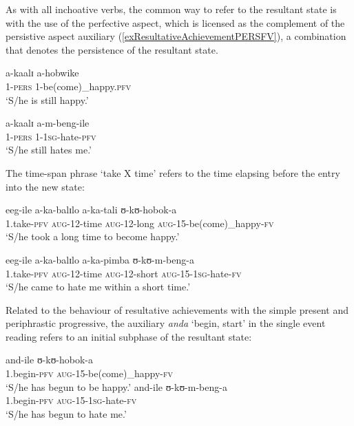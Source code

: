 As with all inchoative verbs, the common way to refer to the resultant state is with the use of the perfective aspect, which is licensed as the complement of the persistive aspect auxiliary (\ref{exResultativeAchievementPERSFV}), a combination that denotes the persistence of the resultant state.
\begin{exe}
\ex \label{exResultativeAchievementPERSFV}\begin{xlist}
\ex\gll a-kaalɪ a-hobwike\\
1-\textsc{pers} 1-be(come)\_happy.\textsc{pfv}\\
\glt `S/he is still happy.'

\ex \gll a-kaalɪ a-m-beng-ile\\
1-\textsc{pers} 1-\textsc{1sg}-hate-\textsc{pfv}\\
\glt \lq S/he still hates me.'
\end{xlist}
\end{exe}

The time-span phrase \lq take X time' refers to the time elapsing before the entry into the new state:

\begin{exe}
\ex \begin{xlist}
\ex \gll eeg-ile a-ka-balɪlo a-ka-tali ʊ-kʊ-hobok-a\\
1.take-\textsc{pfv} \textsc{aug}-12-time \textsc{aug}-12-long \textsc{aug}-15-be(come)\_happy-\textsc{fv}\\
\glt \lq S/he took a long time to become happy.'

\ex \gll eeg-ile a-ka-balɪlo a-ka-pimba ʊ-kʊ-m-beng-a\\
1.take-\textsc{pfv} \textsc{aug}-12-time \textsc{aug}-12-short \textsc{aug}-15-\textsc{1sg}-hate-\textsc{fv}\\
\glt \lq S/he came to hate me within a short time.'
\end{xlist}
\end{exe}

Related to the behaviour of resultative achievements with the simple present and periphrastic progressive, the auxiliary \textit{anda} `begin, start' in the single event reading refers to an initial subphase of the resultant state:
\begin{exe}
\ex \begin{xlist}
\ex \gll and-ile ʊ-kʊ-hobok-a\\
1.begin-\textsc{pfv} \textsc{aug}-15-be(come)\_happy-\textsc{fv}\\
\glt `S/he has begun to be happy.'
\ex\gll and-ile ʊ-kʊ-m-beng-a\\
1.begin-\textsc{pfv} \textsc{aug}-15-\textsc{1sg}-hate-\textsc{fv}\\
\glt \lq S/he has begun to hate me.'
\end{xlist}
\end{exe}

